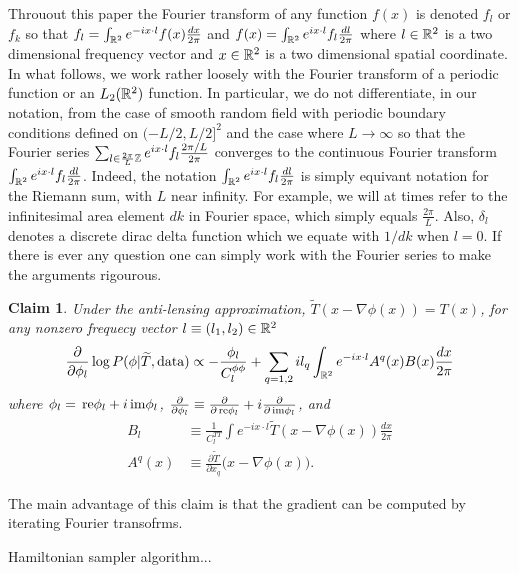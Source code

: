\documentclass[noinfoline]{imsart}
\newtheorem{claim}{Claim}
\newcommand{\re}{\text{\,\rm re}}
\newcommand{\im}{\text{\,\rm im}}
\begin{document}
Throuout this paper the Fourier transform of any function $f(x)$ is denoted $f_l$ or $f_k$ so that
$f_l  =  \int_{\Bbb R^2} e^{-i x\cdot l}  f(x)\frac{dx}{2\pi}$ and
$f(x) =  \int_{\Bbb R^2} e^{i x\cdot l}  f_l \frac{dl}{2\pi}$ 
where $l\in \Bbb R^2$ is a two dimensional frequency vector and $x\in \Bbb R^2$  is a two dimensional spatial coordinate.
In what follows, we work rather loosely with the Fourier transform of a periodic function or an $L_2(\Bbb R^2)$ function. In particular, we do not differentiate, in our notation, from the case of smooth random field with periodic boundary conditions defined on $(-L/2, L/2]^2$ and the case where $L\rightarrow \infty$ so that the Fourier series $\sum_{l \in \frac{2\pi}{L}\Bbb Z }   e^{i x\cdot l}  f_l \frac{2\pi/ L}{2\pi} $ converges to the continuous Fourier transform $\int_{\Bbb R^2}  e^{i x\cdot l}  f_l \frac{dl}{2\pi} $. Indeed, the notation $\int_{\Bbb R^2}  e^{i x\cdot l}  f_l \frac{dl}{2\pi} $ is simply equivant notation for the Riemann sum, with $L$ near infinity. For example, we will at times refer to  the infinitesimal area element $dk$ in Fourier space, which simply equals $\frac{2\pi}{L}$. Also,  $\delta_l$ denotes a discrete dirac delta function which we equate with $1/dk$ when $l=0$. If there is ever any question  one can simply work with the Fourier series to make the arguments rigourous. 

\begin{claim} Under the anti-lensing approximation,  $\widetilde T(x-\nabla\phi(x)) = T(x)$,  for any nonzero frequecy vector $l\equiv (l_1, l_2) \in \Bbb R^2$ 
 \[\frac{\partial}{\partial \phi_l}\log P(\phi | \widetilde T,  \text{\rm data}) \propto -  \frac{\phi_l}{C^{\phi\phi}_{l}} +  \sum_{q=1,2} i  l_q \int_{\Bbb R^2} e^{-i x\cdot l} A^q(x)B(x) \frac{dx}{2\pi}   \]
 where  $\phi_l = \re \phi_l + i \im \phi_l$, $\frac{\partial}{\partial \phi_l}\equiv \frac{\partial}{\partial\re \phi_l} + i \frac{\partial}{\partial\im\phi_l}$, and 
 \begin{align}
 B_l &\equiv \frac{1}{C_l^{TT}} \int e^{-i x\cdot l}  \widetilde T(x-\nabla \phi(x))\frac{dx}{2\pi} \\ 
 A^q(x) &\equiv \frac{\partial\widetilde T}{\partial x_q}\bigl(x-\nabla \phi(x)\bigr).
 \end{align}
\end{claim}

The main advantage of this claim is that the gradient can be computed by iterating Fourier transofrms.

Hamiltonian sampler algorithm...
\end{document}
